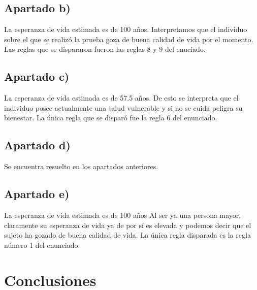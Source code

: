 \documentclass[11pt]{article}
\begin{document}
\subsection*{Apartado b)}

La esperanza de vida estimada es de 100 años. Interpretamos que el individuo
sobre el que se realizó la prueba goza de buena calidad de vida por el momento. Las
reglas que se dispararon fueron las reglas 8 y 9 del enuciado.

\subsection*{Apartado c)}

La esperanza de vida estimada es de 57.5 años. De esto se interpreta que el individuo
posee actualmente una salud vulnerable y si no se cuida peligra su bienestar. La única
regla que se disparó fue la regla 6 del enunciado.

\subsection{Apartado d)}
Se encuentra resuelto en los apartados anteriores.

\subsection*{Apartado e)}
La esperanza de vida estimada es de 100 años Al ser ya una persona mayor, claramente
su esperanza de vida ya de por sí es elevada y podemos decir que el sujeto ha 
gozado de buena calidad de vida. La única regla disparada es la regla número 1
del enunciado.

\section{Conclusiones}
\end{document}
